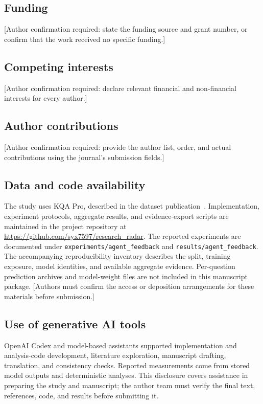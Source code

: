 \documentclass[a4paper,12pt]{article}
\begin{document}
\subsection*{Funding}
[Author confirmation required: state the funding source and grant number, or confirm that the work received no specific funding.]

\subsection*{Competing interests}
[Author confirmation required: declare relevant financial and non-financial interests for every author.]

\subsection*{Author contributions}
[Author confirmation required: provide the author list, order, and actual contributions using the journal's submission fields.]

\subsection*{Data and code availability}
The study uses KQA Pro, described in the dataset publication~\cite{cao2022kqapro}. Implementation, experiment protocols, aggregate results, and evidence-export scripts are maintained in the project repository at \url{https://github.com/syx7597/research_radar}. The reported experiments are documented under \texttt{experiments/agent\_feedback} and \texttt{results/agent\_feedback}. The accompanying reproducibility inventory describes the split, training exposure, model identities, and available aggregate evidence. Per-question prediction archives and model-weight files are not included in this manuscript package. [Authors must confirm the access or deposition arrangements for these materials before submission.]

\subsection*{Use of generative AI tools}
OpenAI Codex and model-based assistants supported implementation and analysis-code development, literature exploration, manuscript drafting, translation, and consistency checks. Reported measurements come from stored model outputs and deterministic analyses. This disclosure covers assistance in preparing the study and manuscript; the author team must verify the final text, references, code, and results before submitting it.


\end{document}
